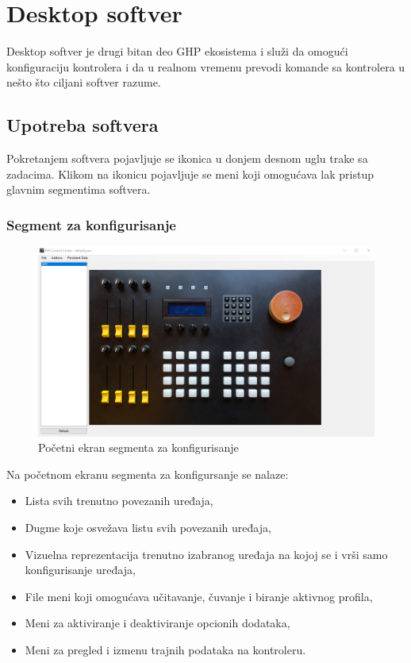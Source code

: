 \documentclass[12pt,oneside]{memoir}
\begin{document}
	\chapter{Desktop softver}
	Desktop softver je drugi bitan deo GHP ekosistema i služi da omogući konfiguraciju kontrolera i da u realnom vremenu prevodi komande sa kontrolera u nešto što ciljani softver razume.
	\section{Upotreba softvera}
	Pokretanjem softvera pojavljuje se ikonica u donjem desnom uglu trake sa zadacima. Klikom na ikonicu pojavljuje se meni koji omogućava lak pristup glavnim segmentima softvera.
	\subsection{Segment za konfigurisanje}
	\begin{figure}[h]
		\includegraphics[width=\textwidth]{conf}
		\caption{Početni ekran segmenta za konfigurisanje}
		\label{Slika:conf}
	\end{figure}
	Na početnom ekranu segmenta za konfigursanje se nalaze:
	\begin{itemize}
		\item Lista svih trenutno povezanih uređaja,
		\item Dugme koje osvežava listu svih povezanih uređaja,
		\item Vizuelna reprezentacija trenutno izabranog uređaja na kojoj se i vrši samo konfigurisanje uređaja,
		\item File meni koji omogućava učitavanje, čuvanje i biranje aktivnog profila,
		\item Meni za aktiviranje i deaktiviranje opcionih dodataka,
		\item Meni za pregled i izmenu trajnih podataka na kontroleru.
	\end{itemize}
\end{document}
